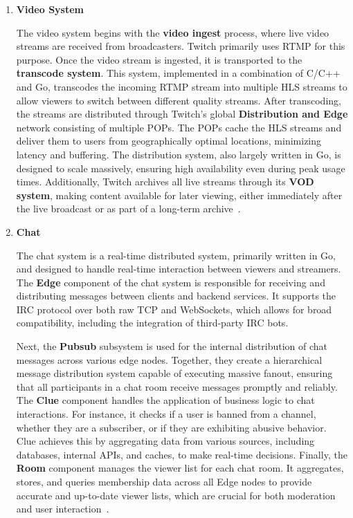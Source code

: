 \begin{enumerate}
    \item \textbf{Video System}
    
    The video system begins with the \textbf{video ingest} process, where live video streams are received from broadcasters. Twitch primarily uses \ac{RTMP} for this purpose. Once the video stream is ingested, it is transported to the \textbf{transcode system}. This system, implemented in a combination of C/C++ and Go, transcodes the incoming \ac{RTMP} stream into multiple \ac{HLS} streams to allow viewers to switch between different quality streams.
    After transcoding, the streams are distributed through Twitch's global \textbf{Distribution and Edge} network consisting of multiple \ac{POPs}. The \ac{POPs} cache the \ac{HLS} streams and deliver them to users from geographically optimal locations, minimizing latency and buffering. The distribution system, also largely written in Go, is designed to scale massively, ensuring high availability even during peak usage times. Additionally, Twitch archives all live streams through its \textbf{\ac{VOD} system}, making content available for later viewing, either immediately after the live broadcast or as part of a long-term archive~\parencite{twitch_engineering}.
    
    \item \textbf{Chat}

    The chat system is a real-time distributed system, primarily written in Go, and designed to handle real-time interaction between viewers and streamers. The \textbf{Edge} component of the chat system is responsible for receiving and distributing messages between clients and backend services. It supports the \ac{IRC} protocol over both raw TCP and WebSockets, which allows for broad compatibility, including the integration of third-party \ac{IRC} bots.
    
    Next, the \textbf{Pubsub} subsystem is used for the internal distribution of chat messages across various edge nodes. Together, they create a hierarchical message distribution system capable of executing massive fanout, ensuring that all participants in a chat room receive messages promptly and reliably. The \textbf{Clue} component handles the application of business logic to chat interactions. For instance, it checks if a user is banned from a channel, whether they are a subscriber, or if they are exhibiting abusive behavior. Clue achieves this by aggregating data from various sources, including databases, internal \ac{API}s, and caches, to make real-time decisions. Finally, the \textbf{Room} component manages the viewer list for each chat room. It aggregates, stores, and queries membership data across all Edge nodes to provide accurate and up-to-date viewer lists, which are crucial for both moderation and user interaction~\parencite{twitch_chat}.


\end{enumerate}
